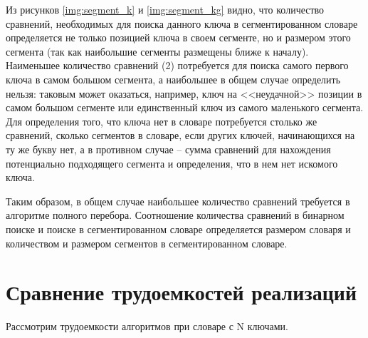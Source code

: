 Из рисунков \ref{img:segment_k} и \ref{img:segment_kg} видно, что количество сравнений, необходимых для поиска данного ключа в сегментированном словаре определяется не только позицией ключа в своем сегменте, но и размером этого сегмента (так как наибольшие сегменты размещены ближе к началу). Наименьшее количество сравнений (2) потребуется для поиска самого первого ключа в самом большом сегмента, а наибольшее в общем случае определить нельзя: таковым может оказаться, например, ключ на <<неудачной>> позиции в самом большом сегменте или единственный ключ из самого маленького сегмента. Для определения того, что ключа нет в словаре потребуется столько же сравнений, сколько сегментов в словаре, если других ключей, начинающихся на ту же букву нет, а в противном случае -- сумма сравнений для нахождения потенциально подходящего сегмента и определения, что в нем нет искомого ключа.



Таким образом, в общем случае наибольшее количество сравнений требуется в алгоритме полного перебора. Соотношение количества сравнений в бинарном поиске и поиске в сегментированном словаре определяется размером словаря и количеством и размером сегментов в сегментированном словаре.

\clearpage
\section{Сравнение трудоемкостей реализаций}

Рассмотрим трудоемкости алгоритмов при словаре с N ключами.

